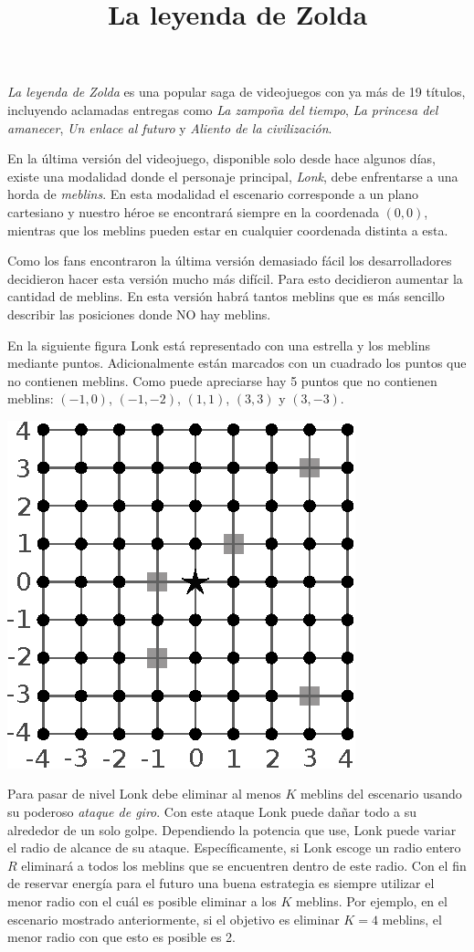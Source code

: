 \documentclass{oci}
\title{La leyenda de Zolda}
\begin{document}
\begin{problemDescription}
  \emph{La leyenda de Zolda} es una popular saga de videojuegos con ya más de 19
  títulos, incluyendo aclamadas entregas como \emph{La zampoña del tiempo},
  \emph{La princesa del amanecer}, \emph{Un enlace al futuro} y \emph{Aliento de
  la civilización}.

  En la última versión del videojuego, disponible solo desde hace algunos días,
  existe una modalidad donde el personaje principal, \emph{Lonk}, debe
  enfrentarse a una horda de \emph{meblins}.
  En esta modalidad el escenario corresponde a un plano cartesiano y nuestro
  héroe se encontrará siempre en la coordenada $(0,0)$, mientras que los meblins
  pueden estar en cualquier coordenada distinta a esta.

  Como los fans encontraron la última versión demasiado fácil los
  desarrolladores decidieron hacer esta versión mucho más difícil.
  Para esto decidieron aumentar la cantidad de meblins.
  En esta versión habrá tantos meblins que es más sencillo describir las
  posiciones donde NO hay meblins.

  En la siguiente figura Lonk está representado con una estrella y los meblins
  mediante puntos.
  Adicionalmente están marcados con un cuadrado los puntos que no contienen meblins.
  Como puede apreciarse hay 5 puntos que no contienen meblins: $(-1,0)$, $(-1,-2)$,
  $(1,1)$, $(3,3)$ y $(3, -3)$.
  \begin{center}
  \includegraphics{zolda}
  \end{center}
  Para pasar de nivel Lonk debe eliminar al menos $K$ meblins del escenario
  usando su poderoso \emph{ataque de giro}.
  Con este ataque Lonk puede dañar todo a su alrededor de un solo golpe.
  Dependiendo la potencia que use, Lonk puede variar el radio de alcance de su
  ataque.
  Específicamente, si Lonk escoge un radio entero $R$ eliminará a todos los
  meblins que se encuentren dentro de este radio.
  Con el fin de reservar energía para el futuro una buena estrategia es siempre
  utilizar el menor radio con el cuál es posible eliminar a los $K$ meblins.
  Por ejemplo, en el escenario mostrado anteriormente, si el objetivo es eliminar
  $K=4$ meblins, el menor radio con que esto es posible es 2.


\end{problemDescription}
\end{document}
